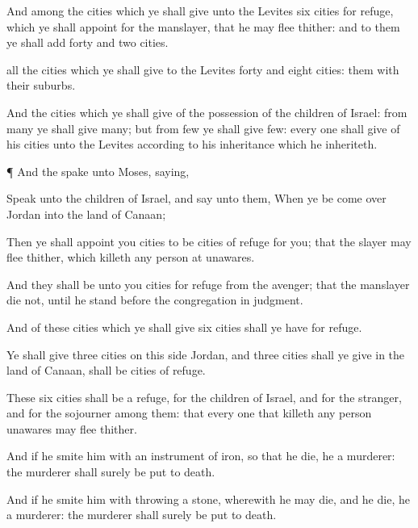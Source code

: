 {And among the
cities which ye shall
give unto the
Levites
{}
six
cities for
refuge, which ye shall
appoint for the
manslayer, that he may
flee thither: and to them ye shall
add
forty and
two
cities.

 all the
cities which ye shall
give to the
Levites
{}
forty and
eight
cities: them
{} with their
suburbs.

And the
cities which ye shall
give
{} of the
possession of the
children of
Israel: from
{}
many ye shall give
many; but from
{}
few ye shall give
few: every
one shall
give of his
cities unto the
Levites
according to his
inheritance which he
inheriteth.


\par }{\PP {}¶ And the
{}
spake unto
Moses,
saying,

Speak unto the
children of
Israel, and
say unto them, When ye be come
over
Jordan into the
land of
Canaan;

Then ye shall
appoint you
cities to be
cities of
refuge for you; that the
slayer may
flee thither, which
killeth any
person at
unawares.

And they shall be unto you
cities for
refuge from the
avenger; that the
manslayer
die not, until he
stand
before the
congregation in
judgment.

And of these
cities which ye shall
give
six
cities shall ye have for
refuge.

Ye shall
give
three
cities on this
side
Jordan, and
three
cities shall ye
give in the
land of
Canaan,
{} shall be
cities of
refuge.

These
six
cities shall be a
refuge,
{} for the
children of
Israel, and for the
stranger, and for the
sojourner
among them: that every one that
killeth any
person
unawares may
flee thither.

And if he
smite him with an
instrument of
iron, so that he
die, he
{} a
murderer: the
murderer shall
surely be put to
death.

And if he
smite him with
throwing a
stone, wherewith he may
die, and he
die, he
{} a
murderer: the
murderer shall
surely be put to
death.

}
